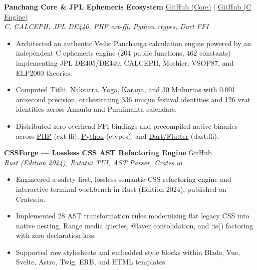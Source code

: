 \documentclass[11pt,a4paper]{article}
\newcommand{\cvlink}[2]{\textcolor{linkblue}{\underline{\href{#1}{#2}}}}
\newcommand{\projectheader}[3]{%
    \noindent\textbf{#1} \hfill #3 \\
    {\small\itshape #2}\par
    \vspace{2pt}
}
\begin{document}
\begin{adjustwidth}{0.25in}{0.25in}

\projectheader{Panchang Core \& JPL Ephemeris Ecosystem}{C, CALCEPH, JPL DE440, PHP ext-ffi, Python ctypes, Dart FFI}{%
  \cvlink{https://github.com/jayeshmepani/panchang-core}{GitHub (Core)} \;$|$\;
  \cvlink{https://github.com/jayeshmepani/jpl-ephemeris}{GitHub (C Engine)}}
\begin{itemize}[leftmargin=0.2in, itemsep=1pt, parsep=0pt, topsep=0pt]
\item Architected an authentic Vedic Panchanga calculation engine powered by an independent C ephemeris engine (204 public functions, 462 constants) implementing JPL DE405/DE440, CALCEPH, Moshier, VSOP87, and ELP2000 theories.
\item Computed Tithi, Nak\d{s}atra, Yoga, Kara\d{n}a, and 30 Muh\=urtas with 0.001 arcsecond precision, orchestrating 336 unique festival identities and 126 vrat identities across Amanta and Purnimanta calendars.
\item Distributed zero-overhead FFI bindings and precompiled native binaries across \cvlink{https://github.com/jayeshmepani/jpl-moshier-ephemeris-php}{PHP} (ext-ffi), \cvlink{https://github.com/jayeshmepani/jpl-moshier-ephemeris-python}{Python} (ctypes), and \cvlink{https://github.com/jayeshmepani/jpl-moshier-ephemeris-dart}{Dart/Flutter} (dart:ffi).
\end{itemize}

\vspace{6pt}

\projectheader{CSSForge — Lossless CSS AST Refactoring Engine}{Rust (Edition 2024), Ratatui TUI, AST Parser, Crates.io}{%
  \cvlink{https://github.com/jayeshmepani/cssforge}{GitHub}}
\begin{itemize}[leftmargin=0.2in, itemsep=1pt, parsep=0pt, topsep=0pt]
\item Engineered a safety-first, lossless semantic CSS refactoring engine and interactive terminal workbench in Rust (Edition 2024), published on Crates.io.
\item Implemented 28 AST transformation rules modernizing flat legacy CSS into native nesting, Range media queries, @layer consolidation, and :is() factoring with zero declaration loss.
\item Supported raw stylesheets and embedded style blocks within Blade, Vue, Svelte, Astro, Twig, ERB, and HTML templates.
\end{itemize}

\vspace{6pt}


\end{adjustwidth}
\end{document}
